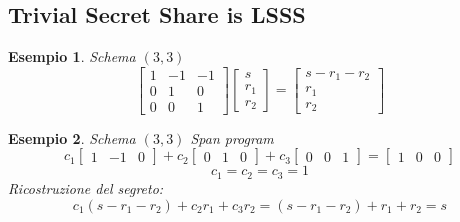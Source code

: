 \documentclass{book}
\newtheorem{esempio}{\textcolor{Grey1}{Esempio}}
\begin{document}
\subsection{Trivial Secret Share is LSSS}
\begin{esempio}
    Schema \((3,3)\)
    \begin{equation*}
        \begin{bmatrix}
            1&-1&-1\\0&1&0\\0&0&1
        \end{bmatrix}\begin{bmatrix}
            s\\r_{1}\\r_{2}
        \end{bmatrix}=\begin{bmatrix}
            s-r_{1}-r_{2}\\r_{1}\\r_{2}
        \end{bmatrix}
    \end{equation*}
\end{esempio}
\begin{esempio}
    Schema \((3,3)\) Span program
    \begin{equation*}
        c_{1}\begin{bmatrix}
            1&-1&0
        \end{bmatrix}+c_{2}\begin{bmatrix}
            0&1&0
        \end{bmatrix}+c_{3}\begin{bmatrix}
            0&0&1
        \end{bmatrix}=\begin{bmatrix}
            1&0&0
        \end{bmatrix}
    \end{equation*}
    \begin{equation*}
        c_{1}=c_{2}=c_{3}=1
    \end{equation*}
    Ricostruzione del segreto:\begin{equation*}
        c_{1}(s-r_{1}-r_{2})+c_{2}r_{1}+c_{3}r_{2}=(s-r_{1}-r_{2})+r_{1}+r_{2}=s
    \end{equation*}
\end{esempio}
\end{document}
